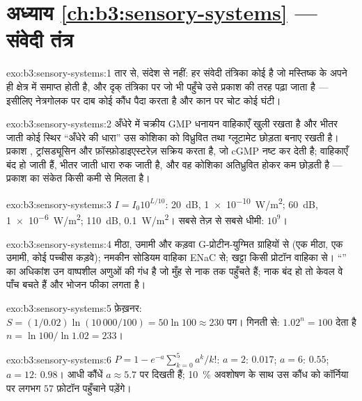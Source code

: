 \section*{अध्याय \ref{ch:b3:sensory-systems} --- संवेदी तंत्र}

\begin{solution}{exo:b3:sensory-systems:1}
तार से, संदेश से नहीं: हर संवेदी तंत्रिका कोई  है जो
मस्तिष्क के अपने ही क्षेत्र में समाप्त होती है, और दृक् तंत्रिका पर जो
भी पहुँचे उसे प्रकाश की तरह पढ़ा जाता है --- इसीलिए नेत्रगोलक पर दाब
कोई कौंध पैदा करता है और कान पर चोट कोई घंटी।
\end{solution}

\begin{solution}{exo:b3:sensory-systems:2}
अँधेरे में चक्रीय GMP धनायन वाहिकाएँ खुली रखता है और भीतर जाती कोई
स्थिर ``अँधेरे की धारा'' उस कोशिका को विध्रुवित तथा ग्लूटामेट छोड़ता
बनाए रखती है। प्रकाश , ट्रांसड्यूसिन और फ़ॉस्फ़ोडाइएस्टरेज़
सक्रिय करता है, जो cGMP नष्ट कर देती है; वाहिकाएँ बंद हो जाती हैं,
भीतर जाती धारा रुक जाती है, और वह कोशिका अतिध्रुवित होकर कम छोड़ती है
--- प्रकाश का संकेत किसी कमी से मिलता है।
\end{solution}

\begin{solution}{exo:b3:sensory-systems:3}
$I = I_{0}10^{L/10}$: \qty{20}{dB}, \qty{1e-10}{W/m^2}; \qty{60}{dB},
\qty{1e-6}{W/m^2}; \qty{110}{dB}, \qty{0.1}{W/m^2}। सबसे तेज़ से सबसे
धीमी: $10^{9}$।
\end{solution}

\begin{solution}{exo:b3:sensory-systems:4}
मीठा, उमामी और कड़वा G-प्रोटीन-युग्मित ग्राहियों से (एक मीठा, एक
उमामी, कोई पच्चीस कड़वे); नमकीन सोडियम वाहिका ENaC से; खट्टा किसी
प्रोटॉन वाहिका से। ``'' का अधिकांश उन वाष्पशील अणुओं की गंध है जो
मुँह से नाक तक पहुँचते हैं; नाक बंद हो तो केवल वे पाँच  बचते हैं
और भोजन फीका लगता है।
\end{solution}

\begin{solution}{exo:b3:sensory-systems:5}
फ़ेख़नर: $S = (1/0.02)\ln(10\,000/100) = 50\ln 100 \approx 230$ पग।
गिनती से: $1.02^{n} = 100$ देता है $n = \ln 100/\ln 1.02 = 233$।
\end{solution}

\begin{solution}{exo:b3:sensory-systems:6}
$P = 1 - e^{-a}\sum_{k=0}^{5}a^{k}/k!$: $a = 2$: $0.017$; $a = 6$:
$0.55$; $a = 12$: $0.98$। आधी कौंधें $a \approx 5.7$ पर दिखती हैं;
\qty{10}{\%} अवशोषण के साथ उस कौंध को कॉर्निया पर लगभग $57$
फ़ोटॉन पहुँचाने पड़ेंगे।
\end{solution}

